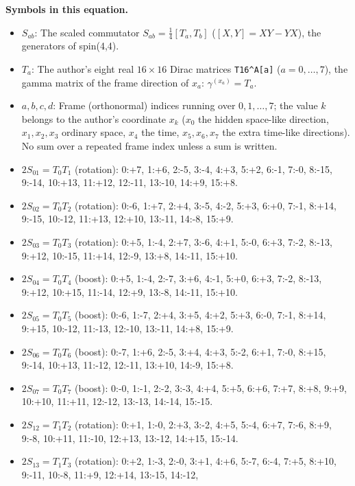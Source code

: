 \documentclass[
  10pt,
]{article}
\begin{document}
\textbf{Symbols in this equation.}

\begin{itemize}
\item
  \(S_{ab}\): The scaled commutator \(S_{ab} = \tfrac14[T_a, T_b]\)
  (\([X, Y] = XY - YX\)), the generators of spin(4,4).
\item
  \(T_a\): The author's eight real \(16 \times 16\) Dirac matrices
  \texttt{T16\^{}A{[}a{]}} (\(a = 0, \dots, 7\)), the gamma matrix of
  the frame direction of \(x_a\): \(\gamma^{(x_a)} = T_a\).
\item
  \(a, b, c, d\): Frame (orthonormal) indices running over
  \(0, 1, \dots, 7\); the value \(k\) belongs to the author's coordinate
  \(x_k\) (\(x_0\) the hidden space-like direction, \(x_1, x_2, x_3\)
  ordinary space, \(x_4\) the time, \(x_5, x_6, x_7\) the extra
  time-like directions). No sum over a repeated frame index unless a sum
  is written.
\item
  \(2S_{01} = T_0T_1\) (rotation): 0:+7, 1:+6, 2:-5, 3:-4, 4:+3, 5:+2,
  6:-1, 7:-0, 8:-15, 9:-14, 10:+13, 11:+12, 12:-11, 13:-10, 14:+9,
  15:+8.
\item
  \(2S_{02} = T_0T_2\) (rotation): 0:-6, 1:+7, 2:+4, 3:-5, 4:-2, 5:+3,
  6:+0, 7:-1, 8:+14, 9:-15, 10:-12, 11:+13, 12:+10, 13:-11, 14:-8,
  15:+9.
\item
  \(2S_{03} = T_0T_3\) (rotation): 0:+5, 1:-4, 2:+7, 3:-6, 4:+1, 5:-0,
  6:+3, 7:-2, 8:-13, 9:+12, 10:-15, 11:+14, 12:-9, 13:+8, 14:-11,
  15:+10.
\item
  \(2S_{04} = T_0T_4\) (boost): 0:+5, 1:-4, 2:-7, 3:+6, 4:-1, 5:+0,
  6:+3, 7:-2, 8:-13, 9:+12, 10:+15, 11:-14, 12:+9, 13:-8, 14:-11,
  15:+10.
\item
  \(2S_{05} = T_0T_5\) (boost): 0:-6, 1:-7, 2:+4, 3:+5, 4:+2, 5:+3,
  6:-0, 7:-1, 8:+14, 9:+15, 10:-12, 11:-13, 12:-10, 13:-11, 14:+8,
  15:+9.
\item
  \(2S_{06} = T_0T_6\) (boost): 0:-7, 1:+6, 2:-5, 3:+4, 4:+3, 5:-2,
  6:+1, 7:-0, 8:+15, 9:-14, 10:+13, 11:-12, 12:-11, 13:+10, 14:-9,
  15:+8.
\item
  \(2S_{07} = T_0T_7\) (boost): 0:-0, 1:-1, 2:-2, 3:-3, 4:+4, 5:+5,
  6:+6, 7:+7, 8:+8, 9:+9, 10:+10, 11:+11, 12:-12, 13:-13, 14:-14,
  15:-15.
\item
  \(2S_{12} = T_1T_2\) (rotation): 0:+1, 1:-0, 2:+3, 3:-2, 4:+5, 5:-4,
  6:+7, 7:-6, 8:+9, 9:-8, 10:+11, 11:-10, 12:+13, 13:-12, 14:+15,
  15:-14.
\item
  \(2S_{13} = T_1T_3\) (rotation): 0:+2, 1:-3, 2:-0, 3:+1, 4:+6, 5:-7,
  6:-4, 7:+5, 8:+10, 9:-11, 10:-8, 11:+9, 12:+14, 13:-15, 14:-12,

\end{itemize}
\end{document}
